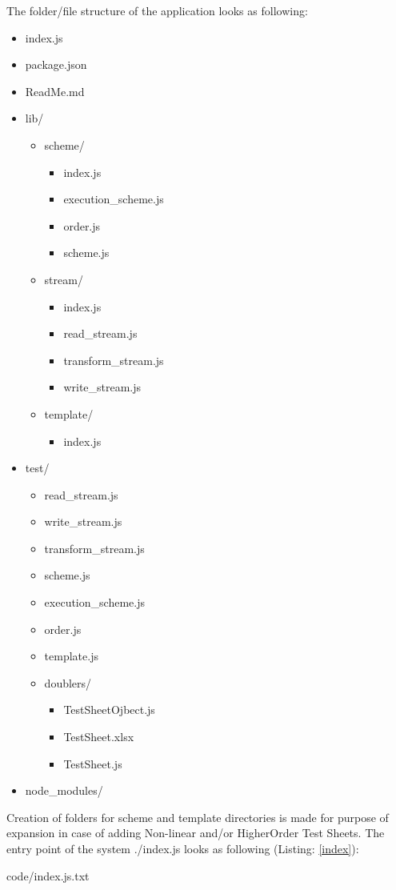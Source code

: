 The folder/file structure of the application looks as following:
\begin{itemize}
	\item index.js
	\item package.json
	\item ReadMe.md
	\item lib/
	\begin{itemize}
		\item scheme/
		\begin{itemize}
			\item index.js
			\item execution\_scheme.js
			\item order.js
			\item scheme.js
		\end{itemize}
		\item stream/
		\begin{itemize}
			\item index.js
			\item read\_stream.js
			\item transform\_stream.js
			\item write\_stream.js
		\end{itemize}
		\item template/
		\begin{itemize}
			\item index.js
		\end{itemize}
	\end{itemize}
	\item test/
	\begin{itemize}
		\item read\_stream.js
		\item write\_stream.js
		\item transform\_stream.js
		\item scheme.js
		\item execution\_scheme.js
		\item order.js
		\item template.js
		\item doublers/
		\begin{itemize}
			\item TestSheetOjbect.js
			\item TestSheet.xlsx
			\item TestSheet.js
		\end{itemize}
	\end{itemize}
	\item node\_modules/
\end{itemize}
Creation of folders for scheme and template directories is made for purpose of expansion in case of adding Non-linear and/or HigherOrder Test Sheets. 
The entry point of the system ./index.js looks as following (Listing: \ref{index}):


{code/index.js.txt}

